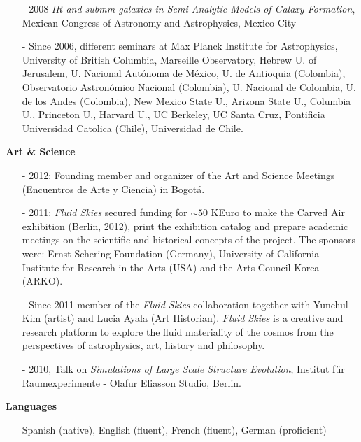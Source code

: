 \documentclass[9pt]{article}
\begin{document}
\begin{itemize}
\item [-] 2008 {\it IR and submm galaxies in Semi-Analytic Models of
  Galaxy Formation}, Mexican Congress of Astronomy and Astrophysics,
  Mexico City 
\item [-] Since 2006, different seminars at Max Planck Institute for
  Astrophysics, University of British Columbia, Marseille Observatory,
  Hebrew U. of Jerusalem, U. Nacional Aut\'onoma de M\'exico, U. de
  Antioquia (Colombia), Observatorio Astron\'omico Nacional
  (Colombia), U. Nacional de Colombia, U. de los Andes (Colombia), New
  Mexico State U., Arizona State U., Columbia U., Princeton U.,
  Harvard U., UC Berkeley, UC Santa Cruz, Pontificia Universidad
  Catolica (Chile), Universidad de Chile. 
\end{itemize}


{\bf Art \& Science}
\begin{itemize}
\item [-] 2012: Founding member and organizer of the Art and Science Meetings (Encuentros de Arte y Ciencia) in Bogot\'a.
\item [-] 2011: {\it Fluid Skies} secured funding for $\sim 50$ KEuro
  to make the Carved Air exhibition (Berlin, 2012), print the
  exhibition catalog and prepare academic meetings on the scientific
  and historical concepts of the project. The sponsors were: Ernst
  Schering Foundation (Germany), University of California Institute
  for Research in the Arts (USA) and the Arts Council Korea (ARKO).  
\item [-] Since 2011 member of the {\it Fluid Skies} collaboration
  together with Yunchul Kim (artist) and Lucia Ayala (Art
  Historian). {\it Fluid Skies} is a creative and research platform to
  explore the fluid materiality of the cosmos from the perspectives of
  astrophysics, art, history and philosophy. 
\item [-] 2010, Talk on {\it Simulations of Large Scale Structure
  Evolution}, Institut f\"ur Raumexperimente - Olafur Eliasson Studio,
  Berlin.  
\end{itemize}


{\bf Languages}
\begin{itemize}
\item[]Spanish (native), English (fluent), French (fluent), German (proficient)
\end{itemize}

\end{document}
